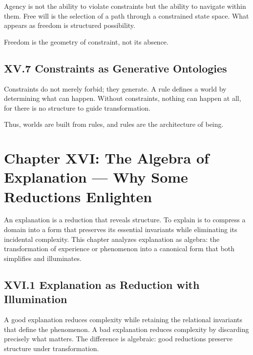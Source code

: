 \documentclass[12pt,letterpaper]{article}
\begin{document}
Agency is not the ability to violate constraints but the ability to navigate within them. Free will is the selection of a path through a constrained state space. What appears as freedom is structured possibility.

Freedom is the geometry of constraint, not its absence.

\subsection{XV.7 Constraints as Generative Ontologies}

Constraints do not merely forbid; they generate. A rule defines a world by determining what can happen. Without constraints, nothing can happen at all, for there is no structure to guide transformation.

Thus, worlds are built from rules, and rules are the architecture of being.

\newpage

\section{Chapter XVI: The Algebra of Explanation — Why Some Reductions Enlighten}

An explanation is a reduction that reveals structure. To explain is to compress a domain into a form that preserves its essential invariants while eliminating its incidental complexity. This chapter analyzes explanation as algebra: the transformation of experience or phenomenon into a canonical form that both simplifies and illuminates.

\subsection{XVI.1 Explanation as Reduction with Illumination}

A good explanation reduces complexity while retaining the relational invariants that define the phenomenon. A bad explanation reduces complexity by discarding precisely what matters. The difference is algebraic: good reductions preserve structure under transformation.
\end{document}
